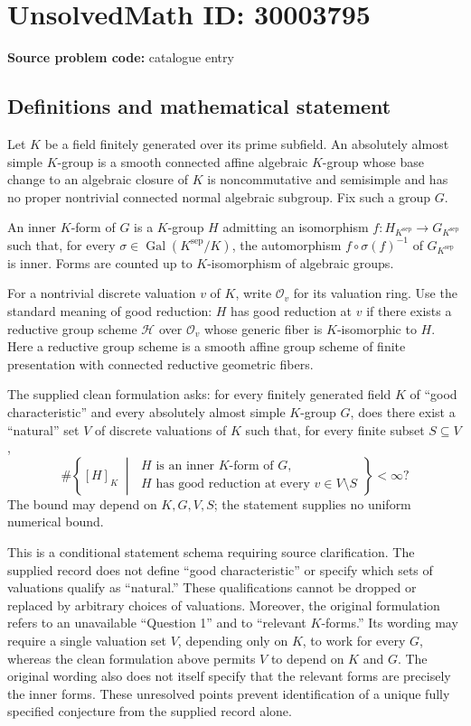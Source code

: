 \documentclass[11pt]{article}
\begin{document}
\section*{UnsolvedMath ID: 30003795}
\textbf{Source problem code:} catalogue entry
\subsection{Definitions and mathematical statement}
Let \(K\) be a field finitely generated over its prime subfield. An absolutely almost simple \(K\)-group is a smooth connected affine algebraic \(K\)-group whose base change to an algebraic closure of \(K\) is noncommutative and semisimple and has no proper nontrivial connected normal algebraic subgroup. Fix such a group \(G\).

An inner \(K\)-form of \(G\) is a \(K\)-group \(H\) admitting an isomorphism \(f:H_{K^{\mathrm{sep}}}\to G_{K^{\mathrm{sep}}}\) such that, for every \(\sigma\in\operatorname{Gal}(K^{\mathrm{sep}}/K)\), the automorphism \(f\circ\sigma(f)^{-1}\) of \(G_{K^{\mathrm{sep}}}\) is inner. Forms are counted up to \(K\)-isomorphism of algebraic groups.

For a nontrivial discrete valuation \(v\) of \(K\), write \(\mathcal O_v\) for its valuation ring. Use the standard meaning of good reduction: \(H\) has good reduction at \(v\) if there exists a reductive group scheme \(\mathcal H\) over \(\mathcal O_v\) whose generic fiber is \(K\)-isomorphic to \(H\). Here a reductive group scheme is a smooth affine group scheme of finite presentation with connected reductive geometric fibers.

The supplied clean formulation asks: for every finitely generated field \(K\) of ``good characteristic'' and every absolutely almost simple \(K\)-group \(G\), does there exist a ``natural'' set \(V\) of discrete valuations of \(K\) such that, for every finite subset \(S\subseteq V\),
\[
\#\left\{
[H]_K\;\middle|\;
\begin{array}{l}
H\text{ is an inner }K\text{-form of }G,\\
H\text{ has good reduction at every }v\in V\setminus S
\end{array}
\right\}<\infty?
\]
The bound may depend on \(K,G,V,S\); the statement supplies no uniform numerical bound.

This is a conditional statement schema requiring source clarification. The supplied record does not define ``good characteristic'' or specify which sets of valuations qualify as ``natural.'' These qualifications cannot be dropped or replaced by arbitrary choices of valuations. Moreover, the original formulation refers to an unavailable ``Question 1'' and to ``relevant \(K\)-forms.'' Its wording may require a single valuation set \(V\), depending only on \(K\), to work for every \(G\), whereas the clean formulation above permits \(V\) to depend on \(K\) and \(G\). The original wording also does not itself specify that the relevant forms are precisely the inner forms. These unresolved points prevent identification of a unique fully specified conjecture from the supplied record alone.
\end{document}
